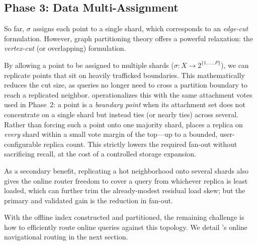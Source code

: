 \subsection{Phase 3: Data Multi-Assignment}
\label{sec:multiassign}
So far, $\sigma$ assigns each point to a single shard, which corresponds to an \emph{edge-cut} formulation. However, graph partitioning theory offers a powerful relaxation: the \emph{vertex-cut} (or overlapping) formulation. 

By allowing a point to be assigned to multiple shards ($\sigma:X\to 2^{\{1,\dots,P\}}$), we can replicate points that sit on heavily trafficked boundaries. This mathematically reduces the cut size, as queries no longer need to cross a partition boundary to reach a replicated neighbor. \sysname operationalizes this with the same attachment votes used in Phase~2: a point is a \emph{boundary point} when its attachment set does not concentrate on a single shard but instead ties (or nearly ties) across several. Rather than forcing such a point onto one majority shard, \sysname places a replica on \emph{every} shard within a small vote margin of the top---up to a bounded, user-configurable replica count. This strictly lowers the required fan-out without sacrificing recall, at the cost of a controlled storage expansion.

As a secondary benefit, replicating a hot neighborhood onto several shards also gives the online router freedom to cover a query from whichever replica is least loaded, which can further trim the already-modest residual load skew; but the primary and validated gain is the reduction in fan-out.

With the offline index constructed and partitioned, the remaining challenge is how to efficiently route online queries against this topology. We detail \sysname's online navigational routing in the next section.
